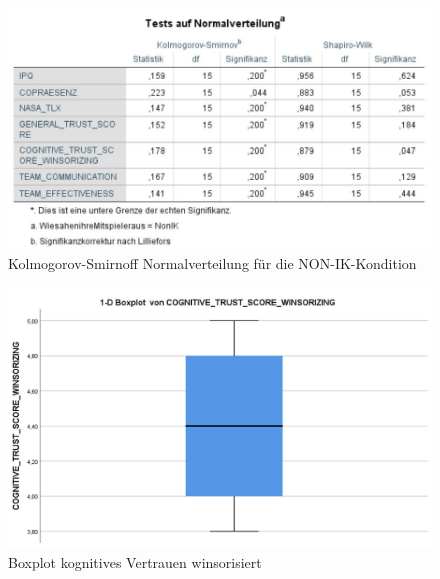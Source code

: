 \documentclass[a4paper,11pt]{article}%
\renewcommand{\\}{\vspace*{0.5\baselineskip} \newline}
\begin{document}
	\begin{figure}[H]
		\begin{footnotesize}
			\includegraphics[width=\textwidth]{Abbildungen/Post_QuestionnaireStatistiks/Normalverteilung_15_NON_IK}\\
			\caption{Kolmogorov-Smirnoff Normalverteilung für die NON-IK-Kondition}
			\label{fig:KolSmirIndNONIK}
		\end{footnotesize}
	\end{figure}	
	
	
\begin{figure}[H]
		\begin{footnotesize}
			\includegraphics[width=\textwidth]{Abbildungen/Post_QuestionnaireStatistiks/boxplot_cognitive_trust_winsorisiert}\\
			\caption{Boxplot kognitives Vertrauen winsorisiert}
			\label{fig:boxplot_cognitive_trust_winsorisiert}
		\end{footnotesize}
	\end{figure}	

\clearpage
\newpage
\end{document}
